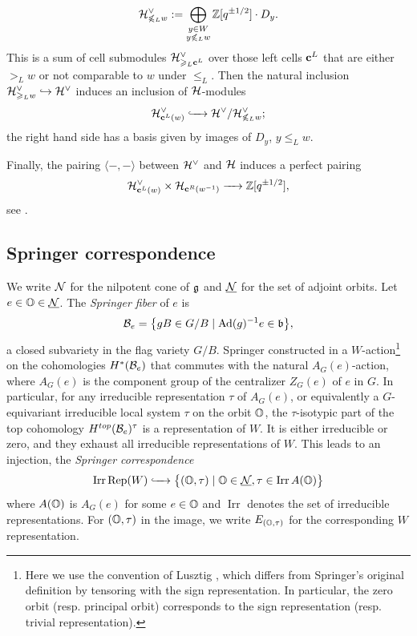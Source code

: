 \documentclass[reqno]{amsart}
\DeclareMathOperator{\Irr}{Irr}
\newcommand{\ubar}[1]{\underline{#1}}
\DeclareMathOperator{\Rep}{Rep}
\begin{document}
\begin{equation*}
	\cH_{\not\le_L w}^\vee 
	:= 
	\bigoplus_{\substack{%
			y \in W\\
			y \not\le_L w}}
	\BZ[q^{\pm1/2}] \cdot D_y.
\end{equation*}
This is a sum of cell submodules $\mathcal{H}_{\geqslant_L \mathbf{c}^L}^\vee$ over those left cells $\mathbf{c}^L$ that are either $>_L w$ or not comparable to $w$ under $\le_L$. Then the natural inclusion $\mathcal{H}_{\geqslant_L w}^\vee \hookrightarrow \mathcal{H}^\vee$ induces an inclusion of $\mathcal{H}$-modules
\begin{equation}\label{eqn:cell-in-quotient}
	\mathcal{H}_{\mathbf{c}^L(w)}^\vee \xhookrightarrow{\;\;\;\;\;} \mathcal{H}^\vee/ \mathcal{H}_{\not\leqslant_L w}^\vee;
\end{equation}
the right hand side has a basis given by images of $D_y$, $y \le_L w$.

Finally, the pairing $\langle -,- \rangle$ between $\mathcal{H}^\vee$ and $\mathcal{H}$ induces a perfect pairing 
\begin{equation}\label{eqn:pairing}
	\mathcal{H}_{\mathbf{c}^L(w)}^\vee \times \mathcal{H}_{\mathbf{c}^R(w^{-1})} \xrightarrow{\;\;\;\;\;} \mathbb{Z}[q^{\pm1/2}],
\end{equation}
see \cite[Proposition 1.2.2]{Bonnafe}.





\subsection{Springer correspondence}

We write $\mathcal{N}$ for the nilpotent cone of $\mathfrak{g}$ and $\ubar \cN$ for the set of adjoint orbits. Let $e \in \BO \in\ubar \cN$. The \textit{Springer fiber} of $e$ is 
\begin{equation*}
	\mathcal{B}_e = \big\{ g B \in G/B \mid \operatorname{Ad}(g)^{-1} e \in \mathfrak{b} \big\},
\end{equation*}
a closed subvariety in the flag variety $G/B$. Springer constructed in \cite{Springer:W} a $W$-action\footnote{Here we use the convention of Lusztig \cite{Lusztig:sp-1}, which differs from Springer's original definition by tensoring with the sign representation. In particular, the zero orbit (resp. principal orbit) corresponds to the sign representation (resp. trivial representation).} on the cohomologies $H^*(\mathcal{B}_e)$ that commutes with the natural $A_G(e)$-action, where $A_G(e)$ is the component group of the centralizer $Z_G(e)$ of $e$ in $G$. In particular, for any irreducible representation $\tau$ of $A_G(e)$, or equivalently a $G$-equivariant irreducible local system $\tau$ on the orbit $\mathbb{O}$, the $\tau$-isotypic part of the top cohomology $H^{top}(\mathcal{B}_e)^\tau$ is a representation of $W$. It is either irreducible or zero, and they exhaust all irreducible representations of $W$. This leads to an injection, the \textit{Springer correspondence}
\begin{equation*}
	\Irr \Rep(W) \injects \big\{ (\BO, \tau) \mid \BO \in \ubar \cN, \tau \in \Irr A(\BO) \big\}
\end{equation*}
where $A(\mathbb{O})$ is $A_G(e)$ for some $e \in \mathbb{O}$ and $\Irr$ denotes the set of irreducible representations. For $(\mathbb{O},\tau)$ in the image, we write $E_{(\mathbb{O},\tau)}$ for the corresponding $W$ representation.
\end{document}
